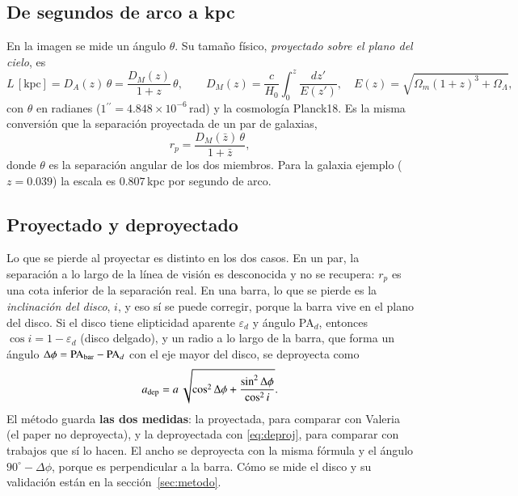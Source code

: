 \documentclass[11pt,a4paper]{article}
\newcommand{\as}{\ensuremath{^{\prime\prime}}}
\begin{document}
\subsection{De segundos de arco a kpc}

En la imagen se mide un ángulo $\theta$. Su tamaño físico, \emph{proyectado sobre el plano del cielo}, es
\begin{equation}\label{eq:kpc}
L\,[\mathrm{kpc}] = D_A(z)\,\theta = \frac{D_M(z)}{1+z}\,\theta,
\qquad
D_M(z) = \frac{c}{H_0}\int_0^{z}\frac{dz'}{E(z')},\quad E(z) = \sqrt{\Omega_m(1+z)^3 + \Omega_\Lambda},
\end{equation}
con $\theta$ en radianes ($1\as = 4.848\times10^{-6}$\,rad) y la cosmología Planck18. Es la misma conversión
que la separación proyectada de un par de galaxias,
\begin{equation}\label{eq:rp}
r_p = \frac{D_M(\bar z)\,\theta}{1+\bar z},
\end{equation}
donde $\theta$ es la separación angular de los dos miembros. Para la galaxia ejemplo
($z = 0.039$) la escala es $0.807$\,kpc por segundo de arco.

\subsection{Proyectado y deproyectado}

Lo que se pierde al proyectar es distinto en los dos casos. En un par, la separación a lo largo de la línea de
visión es desconocida y no se recupera: $r_p$ es una cota inferior de la separación real. En una barra, lo que se
pierde es la \emph{inclinación del disco}, $i$, y eso sí se puede corregir, porque la barra vive en el plano del
disco. Si el disco tiene elipticidad aparente $\varepsilon_d$ y ángulo PA$_d$, entonces $\cos i = 1 - \varepsilon_d$
(disco delgado), y un radio a lo largo de la barra, que forma un ángulo
$\Delta\phi = \mathrm{PA}_{\rm bar} - \mathrm{PA}_d$ con el eje mayor del disco, se deproyecta como
\begin{equation}\label{eq:deproj}
a_{\rm dep} = a\,\sqrt{\cos^2\Delta\phi + \frac{\sin^2\Delta\phi}{\cos^2 i}} .
\end{equation}
El método guarda \textbf{las dos medidas}: la proyectada, para comparar con Valeria (el paper no deproyecta), y la
deproyectada con \eqref{eq:deproj}, para comparar con trabajos que sí lo hacen. El ancho se deproyecta con la misma
fórmula y el ángulo $90^\circ - \Delta\phi$, porque es perpendicular a la barra. Cómo se mide el disco y su
validación están en la sección~\ref{sec:metodo}.
\end{document}
